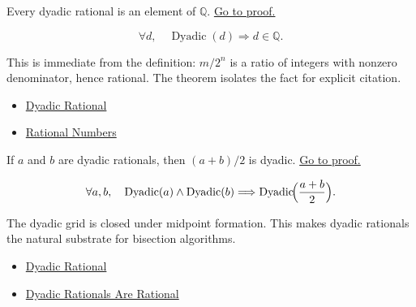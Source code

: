 \begin{theorem}
\label{thm:dyadic-rationals-are-rational}
Every dyadic rational is an element of $\mathbb{Q}$.
\hyperref[prf:dyadic-rationals-are-rational]{Go to proof.}
\end{theorem}

\begin{remark*}
\[
\forall d,\quad \operatorname{Dyadic}(d) \Longrightarrow d\in\mathbb{Q}.
\]
\end{remark*}

\begin{remark*}[Interpretation]
This is immediate from the definition: $m/2^n$ is a ratio of integers with
nonzero denominator, hence rational. The theorem isolates the fact for
explicit citation.
\end{remark*}

\begin{dependencies}
\begin{itemize}
  \item \hyperref[def:dyadic-rational]{Dyadic Rational}
  \item \hyperref[def:rationals]{Rational Numbers}
\end{itemize}
\end{dependencies}

\begin{theorem}
\label{thm:dyadic-midpoint-closure}
If $a$ and $b$ are dyadic rationals, then $(a+b)/2$ is dyadic.
\hyperref[prf:dyadic-midpoint-closure]{Go to proof.}
\end{theorem}

\begin{remark*}
\[
\forall a,b,\quad \operatorname{Dyadic}(a)\land\operatorname{Dyadic}(b)
\Longrightarrow \operatorname{Dyadic}\!\Bigl(\frac{a+b}{2}\Bigr).
\]
\end{remark*}

\begin{remark*}[Interpretation]
The dyadic grid is closed under midpoint formation. This makes dyadic
rationals the natural substrate for bisection algorithms.
\end{remark*}

\begin{dependencies}
\begin{itemize}
  \item \hyperref[def:dyadic-rational]{Dyadic Rational}
  \item \hyperref[thm:dyadic-rationals-are-rational]{Dyadic Rationals Are Rational}
\end{itemize}
\end{dependencies}

